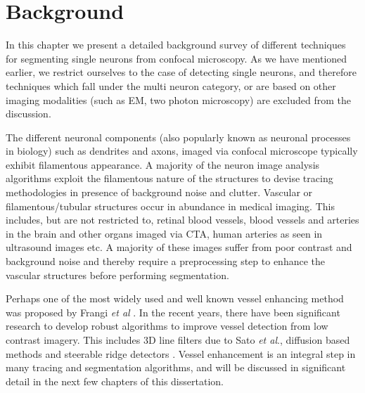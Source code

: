 
\chapter{Background} %

\label{Chapter2} %



In this chapter we present a detailed background survey of different techniques for segmenting single neurons from confocal microscopy. As we have mentioned earlier, we restrict ourselves to the case of detecting single neurons, and therefore techniques which fall under the multi neuron category, or are based on other imaging modalities (such as EM, two photon microscopy) are excluded from the discussion. 

The different neuronal components (also popularly known as neuronal processes in biology) such as dendrites and axons, imaged via confocal microscope typically exhibit filamentous appearance. A majority of the neuron image analysis algorithms exploit the filamentous nature of the structures to devise tracing methodologies in presence of background noise and clutter. Vascular or filamentous/tubular structures occur in abundance in medical imaging. This includes, but are not restricted to, retinal blood vessels, blood vessels and arteries in the brain and other organs imaged via CTA, human arteries as seen in ultrasound images etc. A majority of these images suffer from poor contrast and background noise and thereby require a preprocessing step to enhance the vascular structures before performing segmentation. 

Perhaps one of the most widely used and well known vessel enhancing method was proposed by Frangi \textit{et al} \cite{frangi_vesselness}. In the recent years, there have been significant research to develop robust algorithms to improve vessel detection from low contrast imagery. This includes 3D line filters due to Sato \textit{et al}.\cite{sato1998three}, diffusion based methods\cite{manniesing2006vessel} and steerable ridge detectors \cite{jacob2004steerable}. Vessel enhancement is an integral step in many tracing and segmentation algorithms, and will be discussed in significant detail in the next few chapters of this dissertation.


